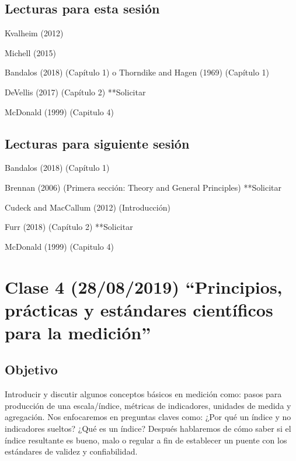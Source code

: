 \documentclass[11pt,]{article}
\begin{document}
\hypertarget{lecturas-para-esta-sesion-1}{%
\subsection{Lecturas para esta
sesión}\label{lecturas-para-esta-sesion-1}}

Kvalheim (2012)

Michell (2015)

Bandalos (2018) (Capítulo 1) o Thorndike and Hagen (1969) (Capítulo 1)

DeVellis (2017) (Capítulo 2) **Solicitar

McDonald (1999) (Capitulo 4)

\hypertarget{lecturas-para-siguiente-sesion-1}{%
\subsection{Lecturas para siguiente
sesión}\label{lecturas-para-siguiente-sesion-1}}

Bandalos (2018) (Capítulo 1)

Brennan (2006) (Primera sección: Theory and General Principles)
**Solicitar

Cudeck and MacCallum (2012) (Introducción)

Furr (2018) (Capítulo 2) **Solicitar

McDonald (1999) (Capitulo 4)

\hypertarget{clase-4-28082019-principios-practicas-y-estandares-cientificos-para-la-medicion}{%
\section{Clase 4 (28/08/2019) ``Principios, prácticas y estándares
científicos para la
medición''}\label{clase-4-28082019-principios-practicas-y-estandares-cientificos-para-la-medicion}}

\hypertarget{objetivo-3}{%
\subsection{Objetivo}\label{objetivo-3}}

Introducir y discutir algunos conceptos básicos en medición como: pasos
para producción de una escala/índice, métricas de indicadores, unidades
de medida y agregación. Nos enfocaremos en preguntas claves como: ¿Por
qué un índice y no indicadores sueltos? ¿Qué es un índice? Después
hablaremos de cómo saber si el índice resultante es bueno, malo o
regular a fin de establecer un puente con los estándares de validez y
confiabilidad.
\end{document}
